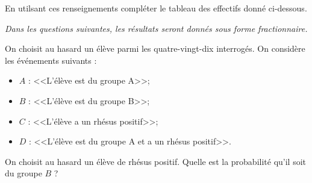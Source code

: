 \begin{questions}
	\question[2] En utilsant ces renseignements compléter le tableau des effectifs donné ci-dessous. 
	
	\emph{Dans les questions suivantes, les résultats seront donnés sous forme fractionnaire.}
	
	
	
	\question On choisit au hasard un élève parmi les quatre-vingt-dix interrogés. On considère les événements suivants :
	
	\begin{itemize}
		\item $A$ : <<L'élève est du groupe A>>;
		\item $B$ : <<L'élève est du groupe B>>;
		\item $C$ : <<L'élève a un rhésus positif>>;
		\item $D$ : <<L'élève est du groupe A et a un rhésus positif>>.
	\end{itemize}


	\question[1] On choisit au hasard un élève de rhésus positif. Quelle est la probabilité qu'il soit du groupe $B$ ?
\end{questions}

